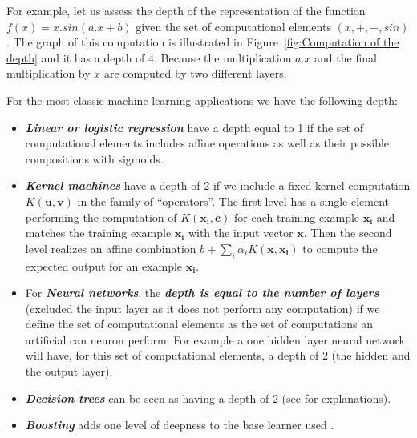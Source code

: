 \documentclass[a4paper,11pt]{report}
\newcommand{\Important}[1]{\textbf{{\em #1}}}
\begin{document}
		For example, let us assess the depth of the representation of the function $f(x)= x.sin(a.x + b)$ given the set of computational elements $(x, +, -, sin)$. The graph of this computation is illustrated in Figure~\ref{fig:Computation of the depth} and it has a depth of $4$. Because the multiplication $a.x$ and the final multiplication by $x$ are computed by two different layers.\\\par
    
		For the most classic machine learning applications we have the following depth:\\
		\begin{itemize}
			\item \Important{Linear or logistic regression} have a depth equal to 1 if the set of computational elements includes affine operations as well as their possible compositions with sigmoids.\\
			
			\item \Important{Kernel machines} have a depth of 2 if we include a fixed kernel computation $K(\mathbf{u},\mathbf{v})$ in the family of ``operators''. The first level has a single element performing the computation of $K(\mathbf{x_{i}},\mathbf{c})$ for each training example $\mathbf{x_{i}}$ and matches the training example $\mathbf{x_{i}}$ with the input vector $\mathbf{x}$. Then the second level realizes an affine combination $b+\sum_{i}{\alpha_{i} K(\mathbf{x},\mathbf{x_{i}})}$ to compute the expected output for an example $\mathbf{x_{i}}$.\\
			
			\item For \Important{Neural networks}, the \Important{depth is equal to the number of layers} (excluded the input layer as it does not perform any computation) if we define the set of computational elements as the set of computations an artificial can neuron perform. For example a one hidden layer neural network will have, for this set of computational elements, a depth of 2 (the hidden and the output layer).\\
			
			\item \Important{Decision trees} can be seen as having a depth of 2 (see \cite{Bengio_2009} for explanations).\\
			
			\item \Important{Boosting} adds one level of deepness to the base learner used \cite{Freund_1996}.\\
		\end{itemize}
       
\end{document}
